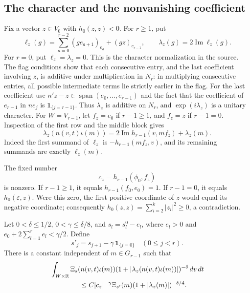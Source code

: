 \subsection{The character and the nonvanishing coefficient}

Fix a vector \(z\in V_0\) with \(h_0(z,z)<0\).
For \(r\geq1\), put
\[
 \ell_z(g)=\sum_{a=0}^{r-2}(ge_{a+1})_{e_a}
                                  +(gz)_{e_{r-1}},
 \qquad \lambda_z(g)=2\operatorname{Im}\ell_z(g).
\]
For \(r=0\), put \(\ell_z=\lambda_z=0\).
This is the character normalization in the source.
The flag conditions show that each consecutive entry, and the
last coefficient involving \(z\), is additive under multiplication
in \(N_r\): in multiplying consecutive entries, all possible
intermediate terms lie strictly earlier in the flag.
For the last coefficient use
\(n'z-z\in\operatorname{span}(e_0,\ldots,e_{r-1})\)
and the fact that the coefficient of \(e_{r-1}\) in \(ne_j\)
is \(\mathbf1_{\{j=r-1\}}\).
Thus \(\lambda_z\) is additive on \(N_r\), and
\(\exp(i\lambda_z)\) is a unitary character.
For \(W=V_{r-1}\), let \(f_z=e_0\) if \(r-1\geq1\),
and \(f_z=z\) if \(r-1=0\).
Inspection of the first row and the middle block gives
\begin{equation}\label{ju-lambda}
 \lambda_z(n(v,t)\iota(m))
       =2\operatorname{Im}h_{r-1}(v,mf_z)+\lambda_z(m).
\end{equation}
Indeed the first summand of \(\ell_z\) is
\(-h_{r-1}(mf_z,v)\), and its remaining summands are
exactly \(\ell_z(m)\).

The fixed number
\[
 c_z=h_{r-1}(\phi_0,f_z)
\]
is nonzero.  If \(r-1\geq1\), it equals
\(h_{r-1}(f_0,e_0)=1\).
If \(r-1=0\), it equals \(h_0(\varepsilon,z)\).
Were this zero, the first positive coordinate of \(z\)
would equal its negative coordinate; consequently
\(h_0(z,z)=\sum_{i=2}^{k}|z_i|^2\geq0\), a contradiction.

\begin{proposition}\label{ju-inner}
Let \(0<\delta\leq1/2\), \(0<\gamma\leq\delta/8\),
and \(s_l=s_l^0-e_l\), where \(e_l>0\) and
\(e_0+2\sum_{l=1}^{r}e_l<\gamma/2\).
Define
\[
 s'_j=s_{j+1}-\gamma\,\mathbf1_{\{j=0\}}
                                      \quad(0\leq j<r).
\]
There is a constant independent of \(m\in G_{r-1}\) such that
\begin{align}
 &\int_{W\times\mathbb R}
  \Xi_s(n(v,t)\iota(m))
  (1+|\lambda_z(n(v,t)\iota(m))|)^{-\delta}\,dv\,dt
  \nonumber\\
 &\hspace{15mm}\leq
 C|c_z|^{-\gamma}\Xi_{s'}(m)
                            (1+|\lambda_z(m)|)^{-\delta/4}.
 \label{ju-inner-bound}
\end{align}
\end{proposition}

